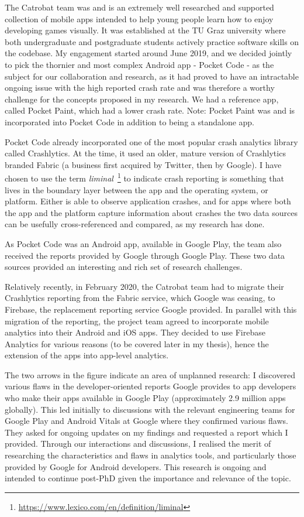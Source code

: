 The Catrobat team was and is an extremely well researched and supported collection of mobile apps intended to help young people learn how to enjoy developing games visually. It was established %
at the TU Graz university where both undergraduate and postgraduate students actively practice software skills on the codebase. My engagement started around June 2019, and we decided jointly to pick the thornier and most complex Android app - Pocket Code - as the subject for our collaboration and research, as it had proved to have an intractable ongoing issue with the high reported crash rate and was therefore a worthy challenge for the concepts proposed in my research. We had a reference app, called Pocket Paint, which had a lower crash rate. Note: Pocket Paint was and is incorporated into Pocket Code in addition to being a standalone app.

Pocket Code already incorporated one of the most popular crash analytics library called Crashlytics. At the time, it used an older, mature version of Crashlytics branded Fabric (a business first acquired by Twitter, then by Google). I have chosen to use the term \emph{liminal}~\footnote{\url{https://www.lexico.com/en/definition/liminal}} to indicate crash reporting is something that lives in the boundary layer between the app and the operating system, or platform. Either is able to observe application crashes, and for apps where both the app and the platform capture information about crashes the two data sources can be usefully cross-referenced and compared, as my research has done.

As Pocket Code was an Android app, available in Google Play, the team also received the reports provided by Google through Google Play. These two data sources provided an interesting and rich set of research challenges. 

Relatively recently, in February 2020, the Catrobat team had to migrate their Crashlytics reporting from the Fabric service, which Google was ceasing, to Firebase, the replacement reporting service Google provided. In parallel with this migration of the reporting, the project team agreed to incorporate mobile analytics into their Android and iOS apps. They decided to use Firebase Analytics for various reasons (to be covered later in my thesis), hence the extension of the apps into app-level analytics.

The two arrows in the figure indicate an area of unplanned research: 
%
I discovered various flaws in the developer-oriented reports Google provides to app developers who make their apps available in Google Play (approximately 2.9 million apps globally). This led initially to discussions with the relevant engineering teams for Google Play and Android Vitals at Google where they confirmed various flaws. They asked for ongoing updates on my findings and requested a report which I provided. Through our interactions and discussions, I realised the merit of researching the characteristics and flaws in analytics tools, and particularly those provided by Google for Android developers. This research is ongoing and intended to continue post-PhD given the importance and relevance of the topic.

